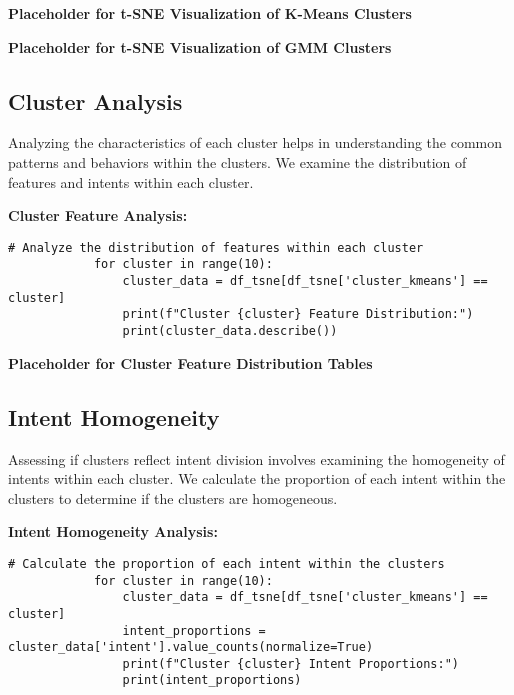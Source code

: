         \vspace{1em}

        \textbf{Placeholder for t-SNE Visualization of K-Means Clusters}

        \textbf{Placeholder for t-SNE Visualization of GMM Clusters}
            
    \subsection{Cluster Analysis}
    
        Analyzing the characteristics of each cluster helps in understanding the common patterns and behaviors within the clusters. We examine the distribution of features and intents within each cluster.

        \textbf{Cluster Feature Analysis:}

        \begin{lstlisting}[caption={Feature Distribution Analysis by Cluster}, label={lst:feature_distribution}]
            # Analyze the distribution of features within each cluster
            for cluster in range(10):
                cluster_data = df_tsne[df_tsne['cluster_kmeans'] == cluster]
                print(f"Cluster {cluster} Feature Distribution:")
                print(cluster_data.describe())
        \end{lstlisting}
        
        \vspace{1em}

        \textbf{Placeholder for Cluster Feature Distribution Tables}
            
    \subsection{Intent Homogeneity}
    
        Assessing if clusters reflect intent division involves examining the homogeneity of intents within each cluster. We calculate the proportion of each intent within the clusters to determine if the clusters are homogeneous.

        \textbf{Intent Homogeneity Analysis:}

        \begin{lstlisting}[caption={Intent Proportions Analysis by Cluster}, label={lst:intent_proportions}]
            # Calculate the proportion of each intent within the clusters
            for cluster in range(10):
                cluster_data = df_tsne[df_tsne['cluster_kmeans'] == cluster]
                intent_proportions = cluster_data['intent'].value_counts(normalize=True)
                print(f"Cluster {cluster} Intent Proportions:")
                print(intent_proportions)
        \end{lstlisting}
        
